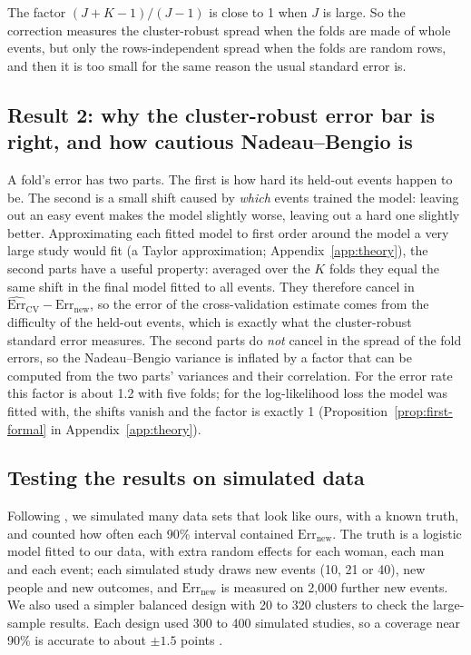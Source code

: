The factor $(J+K-1)/(J-1)$ is close to 1 when $J$ is large. So the correction measures the cluster-robust spread when the
folds are made of whole events, but only the rows-independent spread when the folds are random rows, and then it is
too small for the same reason the usual standard error is.

\subsection{Result 2: why the cluster-robust error bar is right, and how cautious Nadeau--Bengio is}

A fold's error has two parts. The first is how hard its held-out events happen to be. The second is a small shift
caused by \emph{which} events trained the model: leaving out an easy event makes the model slightly worse, leaving out a
hard one slightly better. Approximating each fitted model to first order around the model a very large study would
fit (a Taylor approximation; Appendix~\ref{app:theory}), the second parts have a useful property: averaged over the $K$
folds they equal the same shift in the final model fitted to all events. They therefore cancel in
$\widehat{\mathrm{Err}}_{\mathrm{CV}}-\mathrm{Err}_{\mathrm{new}}$, so the error of the cross-validation estimate comes from the difficulty of the
held-out events, which is exactly what the cluster-robust standard error measures. The second parts do \emph{not}
cancel in the spread of the fold errors, so the Nadeau--Bengio variance is inflated by a factor that can be computed
from the two parts' variances and their correlation. For the error rate this factor is about 1.2 with five folds; for
the log-likelihood loss the model was fitted with, the shifts vanish and the factor is exactly 1
(Proposition~\ref{prop:first-formal} in Appendix~\ref{app:theory}).

\subsection{Testing the results on simulated data}

Following \cite[Sections 3--5]{Morris:2019}, we simulated many data sets that look like ours, with a known truth, and
counted how often each 90\% interval contained $\mathrm{Err}_{\mathrm{new}}$. The truth is a logistic model fitted to our data, with
extra random effects for each woman, each man and each event; each simulated study draws new events (10, 21 or 40),
new people and new outcomes, and $\mathrm{Err}_{\mathrm{new}}$ is measured on 2,000 further new events. We also used a simpler
balanced design with 20 to 320 clusters to check the large-sample results. Each design used 300 to 400 simulated
studies, so a coverage near 90\% is accurate to about $\pm1.5$ points \cite[Section 5.2, Table 6]{Morris:2019}.

